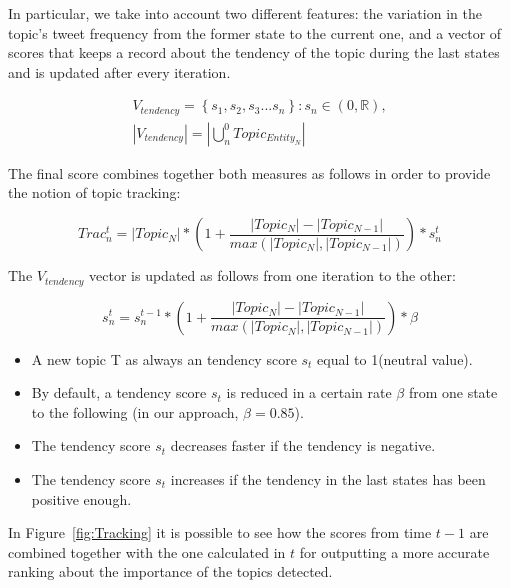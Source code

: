\documentclass{sig-alternate}
\begin{document}
In particular, we take into account two different features: the variation in the topic's tweet frequency from the former state to the current one, and a vector of scores that keeps a record about the tendency of the topic during the last states and is updated after every iteration.

\begin{equation}
\begin{split}
V_{tendency} = \left \{ s_{1} , s_{2} , s_{3} ... s_{n} \right \} :s_{n} \in (0,\mathbb{R}), \\
\left | V_{tendency}  \right |=\left | \bigcup_{n}^{0} Topic_{Entity_N}  \right |
\end{split}
\end{equation}

The final score combines together both measures as follows in order to provide the notion of topic tracking:

\begin{equation}
Trac_{n}^{t} = \left | Topic_{N} \right | *\left ( 1+\frac{\left | Topic_{N}\right |  - \left | Topic_{N-1}\right | }{max \left ( \left | Topic_{N}\right | , \left | Topic_{N-1}\right |  \right ) } \right ) * s_{n}^{t}
\end{equation}

The $V_{tendency}$ vector is updated as follows from one iteration to the other:

\begin{equation}
s_{n}^{t} = s_{n}^{t-1} *\left ( 1+\frac{\left | Topic_{N}\right |  - \left | Topic_{N-1}\right | }{max \left ( \left | Topic_{N}\right | , \left | Topic_{N-1}\right |  \right ) } \right ) * \beta
\end{equation}
\begin{itemize}
  \item A new topic T as always an tendency score $s_{t}$ equal to 1(neutral value).
  \item By default, a tendency score $s_{t}$ is reduced in a certain rate $\beta$ from one state to the following (in our approach, $\beta=0.85$).
  \item The tendency score $s_{t}$ decreases faster if the tendency is negative.
  \item The tendency score $s_{t}$ increases if the tendency in the last states has been positive enough.
\end{itemize}

In Figure~\ref{fig:Tracking} it is possible to see how the scores from time $t-1$ are combined together with the one calculated in $t$ for outputting a more accurate ranking about the importance of the topics detected.
\end{document}
